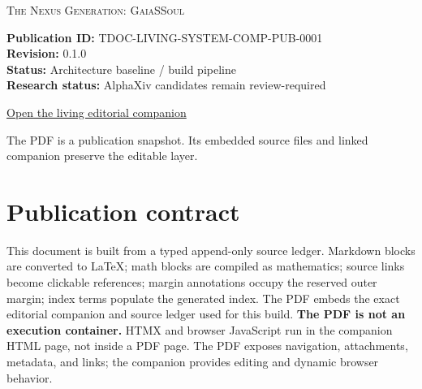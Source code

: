 \documentclass[11pt,oneside]{article}
\begin{document}
\begin{titlepage}
\centering\vspace*{1.4cm}
{\Large\color{NexusGold}\textsc{The Nexus Generation: GaiaSSoul}\par}
\vspace{1.2cm}{\Huge\bfseries A Living System\par}
\vspace{0.35cm}{\Large Computational Publication -- Appendable Edition\par}
\vspace{1.2cm}{\large LaTeX mathematics -- typed data blocks -- dynamic index -- margin annotations\par}
\vfill
\begin{minipage}{0.82\textwidth}
\textbf{Publication ID:} TDOC-LIVING-SYSTEM-COMP-PUB-0001\\
\textbf{Revision:} 0.1.0\\
\textbf{Status:} Architecture baseline / build pipeline\\
\textbf{Research status:} AlphaXiv candidates remain review-required
\end{minipage}
\vfill
\href{https://github.com/NexusCryptic/Welcome-Sentience/tree/main/living-system/editorial}{Open the living editorial companion}
\vspace{0.8cm}
{\small The PDF is a publication snapshot. Its embedded source files and linked companion preserve the editable layer.\par}
\vspace{0.6cm}{\small The Architect / Nexus / Cryptic News LLC\par}
\end{titlepage}
\tableofcontents\clearpage
\section*{Publication contract}
This document is built from a typed append-only source ledger. Markdown blocks are converted to LaTeX; math blocks are compiled as mathematics; source links become clickable references; margin annotations occupy the reserved outer margin; index terms populate the generated index. The PDF embeds the exact editorial companion and source ledger used for this build.
\textbf{The PDF is not an execution container.} HTMX and browser JavaScript run in the companion HTML page, not inside a PDF page. The PDF exposes navigation, attachments, metadata, and links; the companion provides editing and dynamic browser behavior.
\end{document}
